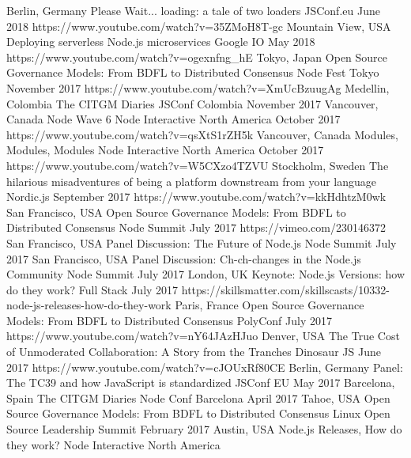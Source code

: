 \documentclass[10pt,a4paper,sans]{moderncv}   %
\begin{document}
\cventry
   {Berlin, Germany}
   {Please Wait... loading: a tale of two loaders}
   {JSConf.eu}
   {June 2018}{}
   {https://www.youtube.com/watch?v=35ZMoH8T-gc}
 \cventry
   {Mountain View, USA}
   {Deploying serverless Node.js microservices}
   {Google I\/O}
   {May 2018}{}
   {https://www.youtube.com/watch?v=ogexnfng\_hE}
 \cventry
   {Tokyo, Japan}
   {Open Source Governance Models: From BDFL to Distributed Consensus}
   {Node Fest Tokyo}
   {November 2017}{}
   {https://www.youtube.com/watch?v=XmUcBzuugAg}
 \cventry
   {Medellin, Colombia}
   {The CITGM Diaries}
   {JSConf Colombia}
   {November 2017}{}
   {}
 \cventry
   {Vancouver, Canada}
   {Node Wave 6}
   {Node Interactive North America}
   {October 2017}{}
   {https://www.youtube.com/watch?v=qsXtS1rZH5k}
 \cventry
   {Vancouver, Canada}
   {Modules, Modules, Modules}
   {Node Interactive North America}
   {October 2017}{}
   {https://www.youtube.com/watch?v=W5CXzo4TZVU}
 \cventry
   {Stockholm, Sweden}
   {The hilarious misadventures of being a platform downstream from your language}
   {Nordic.js}
   {September 2017}{}
   {https://www.youtube.com/watch?v=kkHdhtzM0wk}
 \cventry
   {San Francisco, USA}
   {Open Source Governance Models: From BDFL to Distributed Consensus}
   {Node Summit}
   {July 2017}{}
   {https://vimeo.com/230146372}
 \cventry
   {San Francisco, USA}
   {Panel Discussion: The Future of Node.js}
   {Node Summit}
   {July 2017}{}
   {}
 \cventry
   {San Francisco, USA}
   {Panel Discussion: Ch-ch-changes in the Node.js Community}
   {Node Summit}
   {July 2017}{}
   {}   
 \cventry
   {London, UK}
   {Keynote: Node.js Versions: how do they work?}
   {Full Stack}
   {July 2017}{}
   {https://skillsmatter.com/skillscasts/10332-node-js-releases-how-do-they-work}
 \cventry
   {Paris, France}
   {Open Source Governance Models: From BDFL to Distributed Consensus}
   {PolyConf}
   {July 2017}{}
   {https://www.youtube.com/watch?v=nY64JAzHJuo}
 \cventry
   {Denver, USA}
   {The True Cost of Unmoderated Collaboration: A Story from the Tranches}
   {Dinosaur JS}
   {June 2017}{}
   {https://www.youtube.com/watch?v=cJOUxRf80CE}
 \cventry
   {Berlin, Germany}
   {Panel: The TC39 and how JavaScript is standardized}
   {JSConf EU}
   {May 2017}{}
   {}
 \cventry
   {Barcelona, Spain}
   {The CITGM Diaries}
   {Node Conf Barcelona}
   {April 2017}{}
   {}
 \cventry
   {Tahoe, USA}
   {Open Source Governance Models: From BDFL to Distributed Consensus}
   {Linux Open Source Leadership Summit}
   {February 2017}{}
   {}
 \cventry
   {Austin, USA}
   {Node.js Releases, How do they work?}
   {Node Interactive North America}
\end{document}
